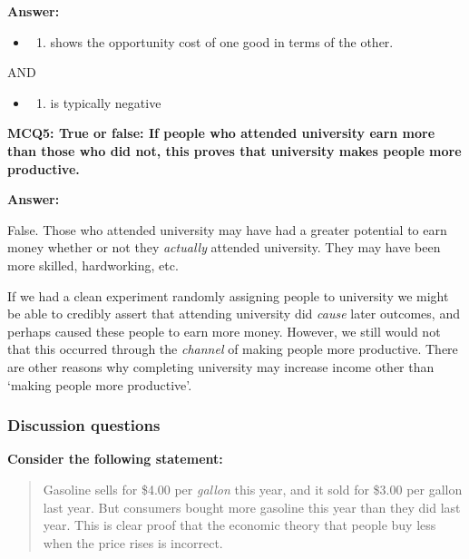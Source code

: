 \documentclass[]{article}
\providecommand{\tightlist}{%
  \setlength{\itemsep}{0pt}\setlength{\parskip}{0pt}}
\begin{document}
\textbf{Answer:}

\begin{itemize}
\item
  \begin{enumerate}
  \def\labelenumi{\alph{enumi}.}
  \setcounter{enumi}{2}
  \tightlist
  \item
    shows the opportunity cost of one good in terms of the other.
  \end{enumerate}
\end{itemize}

AND

\begin{itemize}
\item
  \begin{enumerate}
  \def\labelenumi{\alph{enumi}.}
  \setcounter{enumi}{3}
  \tightlist
  \item
    is typically negative
  \end{enumerate}
\end{itemize}

\bigskip

\textbf{MCQ5: True or false: If people who attended university earn more
than those who did not, this proves that university makes people more
productive.}

\textbf{Answer:}

False. Those who attended university may have had a greater potential to
earn money whether or not they \emph{actually} attended university. They
may have been more skilled, hardworking, etc.

If we had a clean experiment randomly assigning people to university we
might be able to credibly assert that attending university did
\emph{cause} later outcomes, and perhaps caused these people to earn
more money. However, we still would not that this occurred through the
\emph{channel} of making people more productive. There are other reasons
why completing university may increase income other than `making people
more productive'.

\hypertarget{discussion-questions}{%
\subsubsection*{Discussion questions}\label{discussion-questions}}

\textbf{Consider the following statement:}

\begin{quote}
Gasoline sells for \$4.00 per \emph{gallon} this year, and it sold for
\$3.00 per gallon last year. But consumers bought more gasoline this
year than they did last year. This is clear proof that the economic
theory that people buy less when the price rises is incorrect.
\end{quote}
\end{document}
